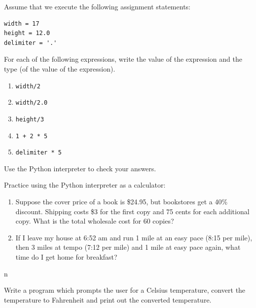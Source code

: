 \documentclass[10pt]{book}
\begin{document}
\begin{ex}
Assume that we execute the following assignment statements:

\begin{verbatim}
width = 17
height = 12.0
delimiter = '.'
\end{verbatim}

For each of the following expressions, write the value of the
expression and the type (of the value of the expression).

\begin{enumerate}

\item {\tt width/2}

\item {\tt width/2.0}

\item {\tt height/3}

\item {\tt 1 + 2 * 5}

\item {\tt delimiter * 5}

\end{enumerate}

Use the Python interpreter to check your answers.
\end{ex}

\begin{ex}
Practice using the Python interpreter as a calculator: 

\begin{enumerate}

\item Suppose the cover price of a book is \$24.95, but bookstores get a
  40\% discount.  Shipping costs \$3 for the first copy and 75 cents
  for each additional copy.  What is the total wholesale cost for
  60 copies?

\item If I leave my house at 6:52 am and run 1 mile at an easy pace
  (8:15 per mile), then 3 miles at tempo (7:12 per mile) and 1 mile at
  easy pace again, what time do I get home for breakfast?


\end{enumerate}
\end{ex}
n
\begin{ex}
Write a program which prompts the user for a Celsius temperature,
convert the temperature to Fahrenheit and print out the converted
temperature.
\end{ex}
\end{document}
